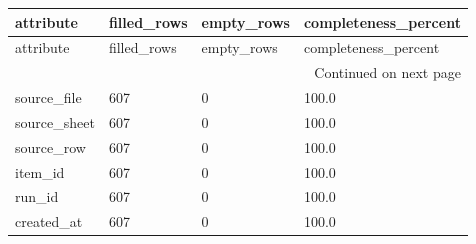 \begingroup
\scriptsize
\begin{longtable}{llll}
\toprule
attribute & filled_rows & empty_rows & completeness_percent \\
\midrule
\endfirsthead
\toprule
attribute & filled_rows & empty_rows & completeness_percent \\
\midrule
\endhead
\midrule
\multicolumn{4}{r}{Continued on next page} \\
\midrule
\endfoot
\bottomrule
\endlastfoot
source\_file & 607 & 0 & 100.0 \\
source\_sheet & 607 & 0 & 100.0 \\
source\_row & 607 & 0 & 100.0 \\
item\_id & 607 & 0 & 100.0 \\
run\_id & 607 & 0 & 100.0 \\
created\_at & 607 & 0 & 100.0 \\
\end{longtable}
\endgroup
